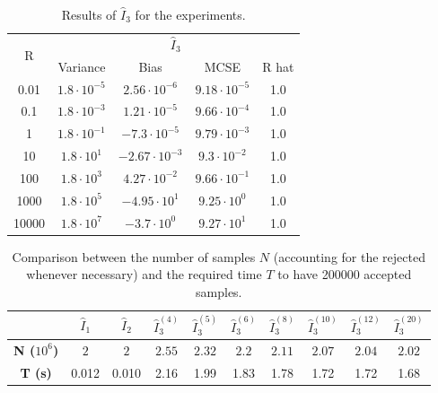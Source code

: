 \documentclass[a4paper,10pt, notitlepage]{report}
\begin{document}
\begin{table}[htb]
    \centering
    \begin{tabular}{ccccc}
    \hline
    \multirow{2}{*}{R} & \multicolumn{4}{c}{$\hat{I}_3$} \\ \cline{2-5} 
     & Variance & Bias & MCSE & R hat \\ \hline
    0.01 & $1.8\cdot 10^{-5}$ & $2.56\cdot 10^{-6}$ & $9.18\cdot 10^{-5}$ & 1.0\\
    0.1 & $1.8\cdot 10^{-3}$ & $1.21\cdot 10^{-5}$ & $9.66\cdot 10^{-4}$ &  1.0\\
    1 & $1.8\cdot 10^{-1}$ & $-7.3\cdot 10^{-5}$ & $9.79\cdot 10^{-3}$ &  1.0\\
    10 & $1.8\cdot 10^{1}$ & $-2.67 \cdot 10^{-3}$ & $9.3\cdot 10^{-2}$ &  1.0\\
    100 & $1.8\cdot 10^{3}$ & $4.27 \cdot 10^{-2}$ & $9.66\cdot 10^{-1}$ &  1.0 \\
    1000 & $1.8\cdot 10^{5}$ & $-4.95 \cdot 10^{1}$ & $9.25\cdot 10^{0}$ &  1.0\\
    10000 & $1.8\cdot 10^{7}$ & $-3.7 \cdot 10^{0}$ & $9.27\cdot 10^{1}$ &  1.0\\ \hline
    \end{tabular}
    \caption{\label{tab:table-ihat3} Results of $\widehat{I}_3$ for the
    experiments.}
\end{table}

\begin{table}[htb]
    \centering
    \begin{tabular}{cccccccccc}
    \hline
    \textbf{} & \textbf{$\hat{I}_1$} & \textbf{$\hat{I}_2$} & \textbf{$\hat{I}_3^{(4)}$} & \textbf{$\hat{I}_3^{(5)}$} & \textbf{$\hat{I}_3^{(6)}$} & \textbf{$\hat{I}_3^{(8)}$} & \textbf{$\hat{I}_3^{(10)}$} & \textbf{$\hat{I}_3^{(12)}$} & \textbf{$\hat{I}_3^{(20)}$} \\ \hline
    \textbf{N ($10^6$)} & $2$ & $2$ & $2.55$ & $2.32$ & $2.2$ & $2.11$ & $2.07$ & $2.04$ & $2.02$ \\
    \textbf{T (s)} & 0.012 & 0.010 & 2.16 & 1.99 & 1.83 & 1.78 & 1.72 & 1.72 & 1.68 \\ \hline
    \end{tabular}
    \caption{\label{tab:time-samples}Comparison between the number of samples $N$
    (accounting for the rejected whenever necessary) and the required time $T$
    to have 200000 accepted samples.}
\end{table}
\end{document}
